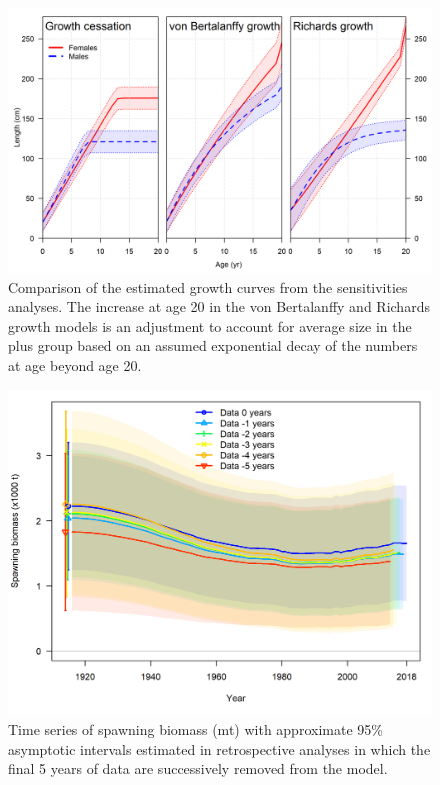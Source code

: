 \documentclass[12pt,]{article}
\begin{document}
\begin{figure}
\centering
\includegraphics{Figures/growth_curve_comparison.png}
\caption{Comparison of the estimated growth curves from the
sensitivities analyses. The increase at age 20 in the von Bertalanffy
and Richards growth models is an adjustment to account for average size
in the plus group based on an assumed exponential decay of the numbers
at age beyond age 20.\label{fig:growth_curve_comparison}}
\end{figure}

\FloatBarrier

\begin{figure}
\centering
\includegraphics{Figures/retro_compare2_spawnbio_uncertainty.png}
\caption{Time series of spawning biomass (mt) with approximate 95\%
asymptotic intervals estimated in retrospective analyses in which the
final 5 years of data are successively removed from the
model.\label{fig:retro}}
\end{figure}
\end{document}
